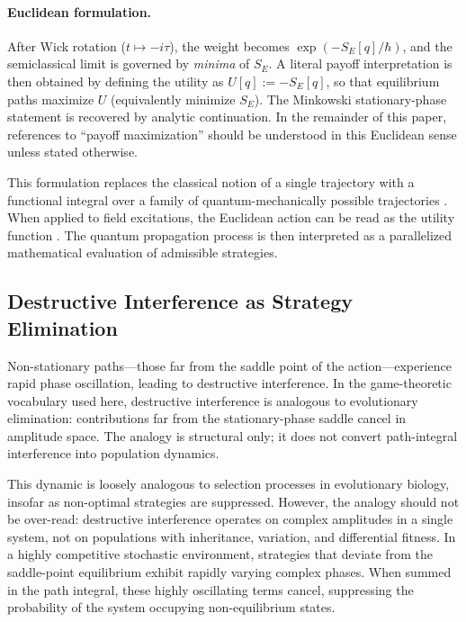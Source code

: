 \documentclass[12pt,a4paper]{article}
\theoremstyle{remark}
\begin{document}
\paragraph{Euclidean formulation.}
After Wick rotation ($t \mapsto -i\tau$), the weight becomes $\exp(-S_E[q]/\hbar)$, and the semiclassical limit is governed by \emph{minima} of $S_E$. A literal payoff interpretation is then obtained by defining the utility as $U[q] := -S_E[q]$, so that equilibrium paths maximize $U$ (equivalently minimize $S_E$). The Minkowski stationary-phase statement is recovered by analytic continuation. In the remainder of this paper, references to ``payoff maximization'' should be understood in this Euclidean sense unless stated otherwise.

This formulation replaces the classical notion of a single trajectory with a functional integral over a family of quantum-mechanically possible trajectories \citep{PathIntegral}. When applied to field excitations, the Euclidean action can be read as the utility function \citep{PathIntegralOptimization}. The quantum propagation process is then interpreted as a parallelized mathematical evaluation of admissible strategies.

\subsection{Destructive Interference as Strategy Elimination}

Non-stationary paths---those far from the saddle point of the action---experience rapid phase oscillation, leading to destructive interference. In the game-theoretic vocabulary used here, destructive interference is analogous to evolutionary elimination: contributions far from the stationary-phase saddle cancel in amplitude space. The analogy is structural only; it does not convert path-integral interference into population dynamics.

This dynamic is loosely analogous to selection processes in evolutionary biology, insofar as non-optimal strategies are suppressed. However, the analogy should not be over-read: destructive interference operates on complex amplitudes in a single system, not on populations with inheritance, variation, and differential fitness. In a highly competitive stochastic environment, strategies that deviate from the saddle-point equilibrium exhibit rapidly varying complex phases. When summed in the path integral, these highly oscillating terms cancel, suppressing the probability of the system occupying non-equilibrium states.
\end{document}
